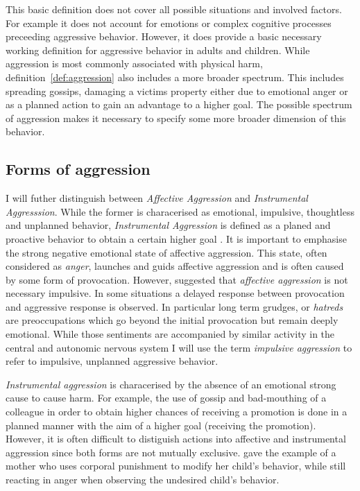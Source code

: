 This basic definition does not cover all possible situations and involved factors.
For example it does not account for emotions or complex cognitive processes preceeding aggressive behavior.
However, it does provide a basic necessary working definition for aggressive behavior in adults and children.  
While aggression is most commonly associated with physical harm, definition~\ref{def:aggression} also includes a more broader spectrum.
This includes spreading gossips, damaging a victims property either due to emotional anger or as a planned action to gain an advantage to a higher goal.
The possible spectrum of aggression makes it necessary to specify some more broader dimension of this behavior.

\subsection{Forms of aggression}
\label{sub:forms_of_aggression}

I will futher distinguish between \textit{Affective Aggression} and \textit{Instrumental Aggresssion}.
While the former is characerised as emotional, impulsive, thoughtless and unplanned behavior, \textit{Instrumental Aggression} is defined as a planed and proactive behavior to obtain a certain higher goal \cite{Berkowitz1993,Geen2001}.
It is important to emphasise the strong negative emotional state of affective aggression.
This state, often considered as \textit{anger}, launches and guids affective aggression \citet{Geen2001} and is often caused by some form of provocation.
However, \cite{Frijda1994} suggested that \textit{affective aggression} is not necessary impulsive.
In some situations a delayed response between provocation and aggressive response is observed. 
In particular long term grudges, or \textit{hatreds} are preoccupations which go beyond the initial provocation but remain deeply emotional.
While those sentiments are accompanied by similar activity in the central and autonomic nervous system %
I will use the term \textit{impulsive aggression} to refer to impulsive, unplanned aggressive behavior.

\textit{Instrumental aggression} is characerised by the absence of an emotional strong cause to cause harm.
For example, the use of gossip and bad-mouthing of a colleague in order to obtain higher chances of receiving a promotion is done in a planned manner with the aim of a higher goal (receiving the promotion).
However, it is often difficult to distiguish actions into affective and instrumental aggression since both forms are not mutually exclusive.
\citet{Geen2001} gave the example of a mother who uses corporal punishment to modify her child's behavior, while still reacting in anger when observing the undesired child's behavior.

